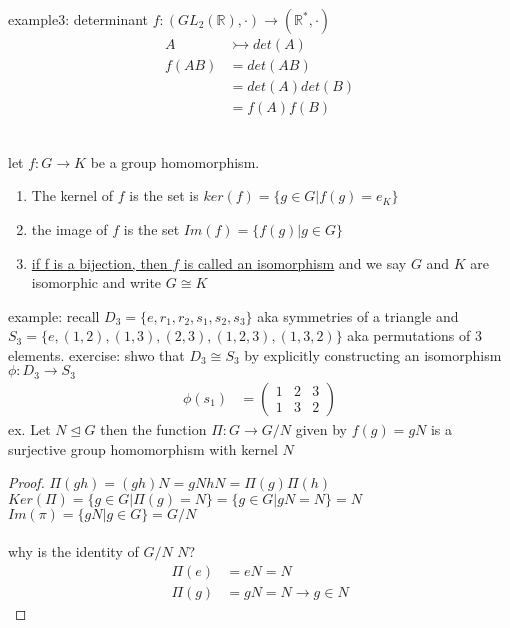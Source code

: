 \documentclass{article}
\begin{document}
    
    example3: determinant $f: (GL_2(\mathbb{R}), \cdot) \rightarrow (\mathbb{R}^*, \cdot)$ 
    \begin{align*}
        A &\rightarrowtail det(A) \\ 
        f(AB) &= det(AB) \\
        &= det(A) det(B) \\
        &= f(A) f(B)
    \end{align*}
    \begin{definition}[2.4.5] \leavevmode \\
        let $f: G \rightarrow K$ be a group homomorphism. 
        \begin{enumerate}
            \item The kernel of $f$ is the set is $ker(f) = \{ g \in G | f(g) = e_K \}$
            \item the image of $f$ is the set $Im(f) = \{ f(g) | g \in G \}$
            \item \underline{if f is a bijection, then $f$ is called an isomorphism} and we say $G$ and $K$ are isomorphic and write $G \cong K$
        \end{enumerate} 
    \end{definition}
example: recall $D_3 = \{e, r_1, r_2, s_1, s_2, s_3\}$ aka symmetries of a triangle 
and $S_3 = \{e, (1,2), (1,3), (2,3), (1,2,3), (1,3,2)\}$ aka permutations of 3 elements.
exercise: shwo that $D_3 \cong S_3$ by explicitly constructing an isomorphism $\phi: D_3 \rightarrow S_3$
\\ 
\begin{align*}
    \phi(s_1) &=  \begin{pmatrix} 
        1 & 2 & 3 \\ 
        1 & 3 & 2
        \end{pmatrix}
\end{align*}
ex. Let $N \trianglelefteq G$ then the function $\Pi: G \rightarrow G / N$ given by $f(g) = gN$ is a surjective group homomorphism with kernel $N$
\begin{proof}
    $\Pi(gh) = (gh) N = gN hN = \Pi(g) \Pi(h)$ \\ 
    $Ker(\Pi) = \{ g \in G | \Pi(g) = N \} = \{ g \in G | gN = N \} = N$ \\ 
    $Im(\pi) = \{ gN | g \in G \} = G / N$ \\ \\ 
    why is the identity of $G / N$ $N$? 
    \begin{align*}
        \Pi(e) &= eN = N \\ 
        \Pi(g) &= gN = N \rightarrow g \in N
    \end{align*}
\end{proof}
\end{document}
